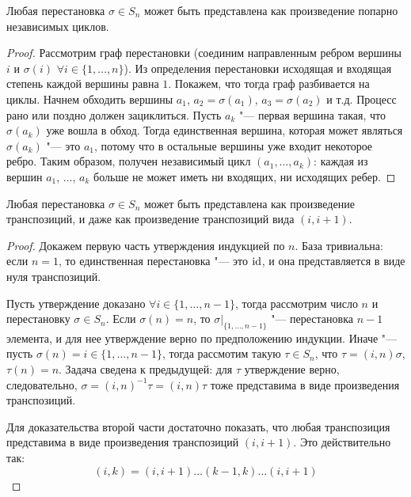 \begin{proposition}
	Любая перестановка $\sigma \in S_n$ может быть представлена как произведение попарно независимых циклов.
\end{proposition}

\begin{proof}
	Рассмотрим граф перестановки (соединим направленным ребром вершины $i$ и $\sigma(i)$ $\forall i \in \{1, \dots, n\}$). Из определения перестановки исходящая и входящая степень каждой вершины равна $1$. Покажем, что тогда граф разбивается на циклы. Начнем обходить вершины $a_1$, $a_2 = \sigma(a_1)$, $a_3 = \sigma(a_2)$ и т.\:д. Процесс рано или поздно должен зациклиться. Пусть $a_k$ "--- первая вершина такая, что $\sigma(a_k)$ уже вошла в обход. Тогда единственная вершина, которая может являться $\sigma(a_k)$ "--- это $a_1$, потому что в остальные вершины уже входит некоторое ребро. Таким образом, получен независимый цикл $(a_1, \dots, a_k)$: каждая из вершин $a_1$, $\dots$, $a_k$ больше не может иметь ни входящих, ни исходящих ребер.
\end{proof}

\begin{proposition}
	Любая перестановка $\sigma \in S_n$  может быть представлена как произведение транспозиций, и даже как произведение транспозиций вида $(i, i+1)$.
\end{proposition}

\begin{proof}
	Докажем первую часть утверждения индукцией по $n$. База тривиальна: если $n = 1$, то единственная перестановка "--- это $\mathrm{id}$, и она представляется в виде нуля транспозиций.
	
	Пусть утверждение доказано $\forall i \in \{1, \dots, n - 1\}$, тогда рассмотрим число $n$ и перестановку $\sigma \in S_n$. Если $\sigma(n) = n$, то $\sigma|_{\{1, \dots, n-1\}}$ "--- перестановка $n-1$ элемента, и для нее утверждение верно по предположению индукции. Иначе "--- пусть $\sigma(n) = i \in \{1,\dots, n - 1\}$, тогда рассмотим такую $\tau \in S_n$, что $\tau = (i, n)\sigma$, $\tau(n) = n$. Задача сведена к предыдущей: для $\tau$ утверждение верно, следовательно, $\sigma = (i, n)^{-1}\tau = (i, n)\tau$ тоже представима в виде произведения транспозиций.
		
	Для доказательства второй части достаточно показать, что любая транспозиция представима в виде произведения транспозиций $(i, i+1)$. Это действительно так: \[(i, k) = (i, i+1)\dots(k - 1, k)\dots(i, i + 1)\]
\end{proof}

